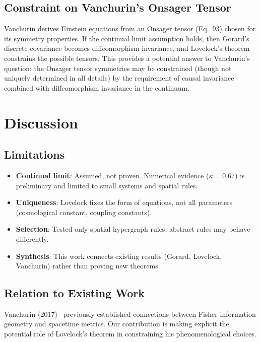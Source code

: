 \documentclass[11pt]{article}
\begin{document}
\subsection{Constraint on Vanchurin's Onsager Tensor}

Vanchurin derives Einstein equations from an Onsager tensor (Eq.~93) chosen for its symmetry properties. If the continual limit assumption holds, then Gorard's discrete covariance becomes diffeomorphism invariance, and Lovelock's theorem constrains the possible tensors. This provides a potential answer to Vanchurin's question: the Onsager tensor symmetries may be constrained (though not uniquely determined in all details) by the requirement of causal invariance combined with diffeomorphism invariance in the continuum.

\section{Discussion}

\subsection{Limitations}

\begin{itemize}
\item \textbf{Continual limit}: Assumed, not proven. Numerical evidence ($\kappa=0.67$) is preliminary and limited to small systems and spatial rules.
\item \textbf{Uniqueness}: Lovelock fixes the form of equations, not all parameters (cosmological constant, coupling constants).
\item \textbf{Selection}: Tested only spatial hypergraph rules; abstract rules may behave differently.
\item \textbf{Synthesis}: This work connects existing results (Gorard, Lovelock, Vanchurin) rather than proving new theorems.
\end{itemize}

\subsection{Relation to Existing Work}

Vanchurin (2017)~\cite{Vanchurin2017} previously established connections between Fisher information geometry and spacetime metrics. Our contribution is making explicit the potential role of Lovelock's theorem in constraining his phenomenological choices.
\end{document}
